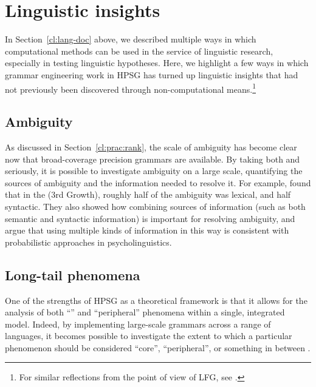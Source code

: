 \documentclass[output=paper,nonflat]{langsci/langscibook}
\begin{document}


\section{Linguistic insights}
\label{cl:insight}

In Section~\ref{cl:lang-doc} above, we described multiple ways in which computational methods can be used in the service of linguistic research, especially in testing linguistic hypotheses. Here, we highlight a few ways in which grammar engineering work in HPSG has turned up linguistic insights that had not previously been discovered through non-computational means.\footnote{For similar reflections from the point of view of LFG, see \cite{King:16}.}

\subsection{Ambiguity} %

As discussed in Section~\ref{cl:prac:rank},
the scale of ambiguity has become clear now that
broad-coverage precision grammars are available. 
By taking both  and  seriously,
it is possible to investigate ambiguity on a large scale,
quantifying the sources of ambiguity and the information needed to resolve it.
For example, \citet{Tou:Man:Shi:Fli:Oep:02,Tou:Man:Fli:Oep:05}
found that in the   (3rd Growth),
roughly half of the ambiguity was lexical, and half syntactic.
They also showed how combining sources of information
(such as both semantic and syntactic information)
is important for resolving ambiguity,
and argue that using multiple kinds of information in this way
is consistent with probabilistic approaches in psycholinguistics.

\subsection{Long-tail phenomena} %

One of the strengths of HPSG as a theoretical framework is that it allows for
the analysis of both ``'' and ``peripheral'' phenomena within a single, integrated model.
Indeed, by implementing large-scale grammars across a range of languages,
it becomes possible to investigate the extent to which
a particular phenomenon should be considered ``core'', ``peripheral'',
or something in between \citep{MuellerKernigkeit}.
\end{document}
